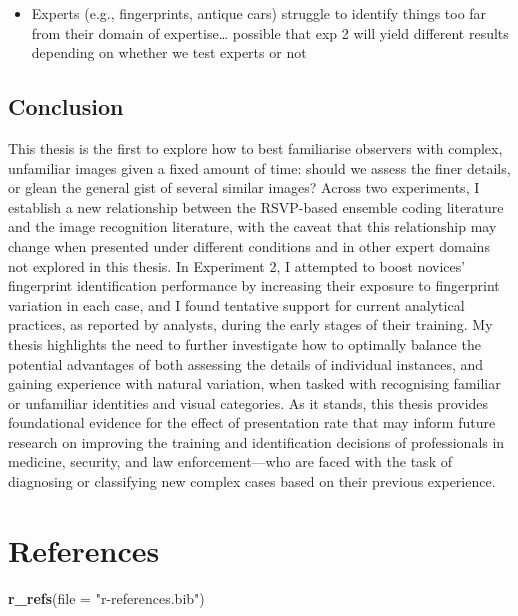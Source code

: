 \documentclass[
  english,
  man]{apa6}
\newenvironment{Shaded}{\begin{snugshade}}{\end{snugshade}}
\newcommand{\DataTypeTok}[1]{\textcolor[rgb]{0.13,0.29,0.53}{#1}}
\newcommand{\KeywordTok}[1]{\textcolor[rgb]{0.13,0.29,0.53}{\textbf{#1}}}
\newcommand{\NormalTok}[1]{#1}
\newcommand{\StringTok}[1]{\textcolor[rgb]{0.31,0.60,0.02}{#1}}
\providecommand{\tightlist}{%
  \setlength{\itemsep}{0pt}\setlength{\parskip}{0pt}}
\newenvironment{cslreferences}%
  {}%
  {\par}
\begin{document}
\begin{itemize}
\tightlist
\item
  Experts (e.g., fingerprints, antique cars) struggle to identify things too far from their domain of expertise\ldots{} possible that exp 2 will yield different results depending on whether we test experts or not
\end{itemize}

\hypertarget{conclusion}{%
\subsection{Conclusion}\label{conclusion}}

This thesis is the first to explore how to best familiarise observers with complex, unfamiliar images given a fixed amount of time: should we assess the finer details, or glean the general gist of several similar images? Across two experiments, I establish a new relationship between the RSVP-based ensemble coding literature and the image recognition literature, with the caveat that this relationship may change when presented under different conditions and in other expert domains not explored in this thesis. In Experiment 2, I attempted to boost novices' fingerprint identification performance by increasing their exposure to fingerprint variation in each case, and I found tentative support for current analytical practices, as reported by analysts, during the early stages of their training. My thesis highlights the need to further investigate how to optimally balance the potential advantages of both assessing the details of individual instances, and gaining experience with natural variation, when tasked with recognising familiar or unfamiliar identities and visual categories. As it stands, this thesis provides foundational evidence for the effect of presentation rate that may inform future research on improving the training and identification decisions of professionals in medicine, security, and law enforcement---who are faced with the task of diagnosing or classifying new complex cases based on their previous experience.

\newpage

\hypertarget{references}{%
\section{References}\label{references}}

\begin{Shaded}
\begin{Highlighting}[]
\KeywordTok{r\_refs}\NormalTok{(}\DataTypeTok{file =} \StringTok{"r{-}references.bib"}\NormalTok{)}
\end{Highlighting}
\end{Shaded}

\begingroup
\setlength{\parindent}{-0.5in}
\setlength{\leftskip}{0.5in}

\hypertarget{refs}{}
\begin{cslreferences}
\end{cslreferences}

\endgroup
\end{document}
